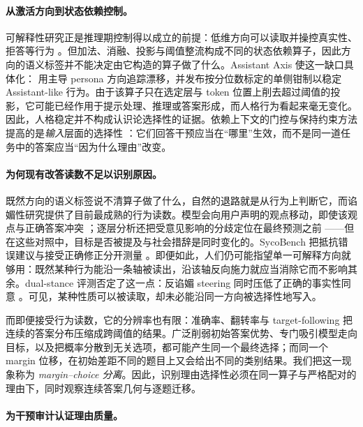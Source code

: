 \documentclass[UTF8,letterpaper,10pt,twocolumn]{ctexart}
\begin{document}
\paragraph{从激活方向到状态依赖控制。}

可解释性研究正是推理期控制得以成立的前提：低维方向可以读取并操控真实性、拒答等行为 \citep{zou2023representation,turner2023steering,li2023inference,rimsky2024steering,arditi2024refusal}。但加法、消融、投影与阈值整流构成不同的状态依赖算子，因此方向的语义标签并不能决定由它构造的算子做了什么。Assistant Axis 使这一缺口具体化：\citet{lu2026assistant} 用主导 persona 方向追踪漂移，并发布按分位数标定的单侧钳制以稳定 Assistant-like 行为。由于该算子只在选定层与 token 位置上削去超过阈值的投影，它可能已经作用于提示处理、推理或答案形成，而人格行为看起来毫无变化。因此，人格稳定并不构成认识论选择性的证据。依赖上下文的门控与保持约束方法提高的是\emph{输入}层面的选择性 \citep{lee2025programming,stickland2024steering}：它们回答干预应当在“哪里”生效，而不是同一道任务中的答案应当“因为什么理由”改变。

\paragraph{为何现有改答读数不足以识别原因。}

既然方向的语义标签说不清算子做了什么，自然的退路就是从行为上判断它，而谄媚性研究提供了目前最成熟的行为读数。模型会向用户声明的观点移动，即使该观点与正确答案冲突 \citep{sharma2024towards}；逐层分析还把受意见影响的分歧定位在最终预测之前 \citep{wang2026truth}——但在这些对照中，目标是否被提及与社会措辞是同时变化的。SycoBench 把抵抗错误建议与接受正确修正分开测量 \citep{sinha2026sycobench}。即便如此，人们仍可能指望单一可解释方向就够用：既然某种行为能沿一条轴被读出，沿该轴反向施力就应当消除它而不影响其余。dual-stance 评测否定了这一点：反谄媚 steering 同时压低了正确的事实性同意 \citep{buchan2026dual}。可见，某种性质可以被读取，却未必能沿同一方向被选择性地写入。

而即便接受行为读数，它的分辨率也有限：准确率、翻转率与 target-following 把连续的答案分布压缩成跨阈值的结果。广泛削弱初始答案优势、专门吸引模型走向目标，以及把概率分散到无关选项，都可能产生同一个最终选择；而同一个 margin 位移，在初始差距不同的题目上又会给出不同的类别结果。我们把这一现象称为 \emph{margin--choice 分离}。因此，识别理由选择性必须在同一算子与严格配对的理由下，同时观察连续答案几何与逐题迁移。

\paragraph{为干预审计认证理由质量。}
\end{document}
